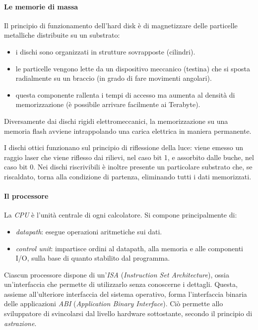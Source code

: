 \documentclass[class=book, crop=false]{standalone}
\begin{document}
\paragraph{Le memorie di massa}
Il principio di funzionamento dell'hard disk è di magnetizzare delle particelle metalliche distribuite su un substrato:
\begin{itemize}[noitemsep]
  \item i dischi sono organizzati in strutture sovrapposte (cilindri).
  \item le particelle vengono lette da un dispositivo meccanico (testina) che si sposta radialmente su un braccio (in grado di fare movimenti angolari).
  \item questa componente rallenta i tempi di accesso ma aumenta al densità di memorizzazione (è possibile arrivare facilmente ai Terabyte).
\end{itemize}

Diversamente dai dischi rigidi elettromeccanici, la memorizzazione su una memoria flash avviene intrappolando una carica elettrica in maniera permanente.

I dischi ottici funzionano sul principio di riflessione della luce: viene emesso un raggio laser che viene riflesso dai rilievi, nel caso bit 1, e assorbito dalle buche, nel caso bit 0. Nei dischi riscrivibili è inoltre presente un particolare substrato che, se riscaldato, torna alla condizione di partenza, eliminando tutti i dati memorizzati.

\paragraph*{Il processore}
La \emph{CPU} è l'unità centrale di ogni calcolatore. Si compone principalmente di:
\begin{itemize}[noitemsep]
  \item \emph{datapath}: esegue operazioni aritmetiche sui dati.
  \item \emph{control unit}: impartisce ordini al datapath, alla memoria e alle componenti I/O, sulla base di quanto stabilito dal programma.
\end{itemize}
Ciascun processore dispone di un'\emph{ISA} (\emph{Instruction Set Architecture}), ossia un'interfaccia che permette di utilizzarlo senza conoscerne i dettagli. Questa, assieme all'ulteriore interfaccia del sistema operativo, forma l'interfaccia binaria delle applicazioni \emph{ABI} (\emph{Application Binary Interface}). Ciò permette allo sviluppatore di svincolarsi dal livello hardware sottostante, secondo il principio di \emph{astrazione}.
\end{document}
